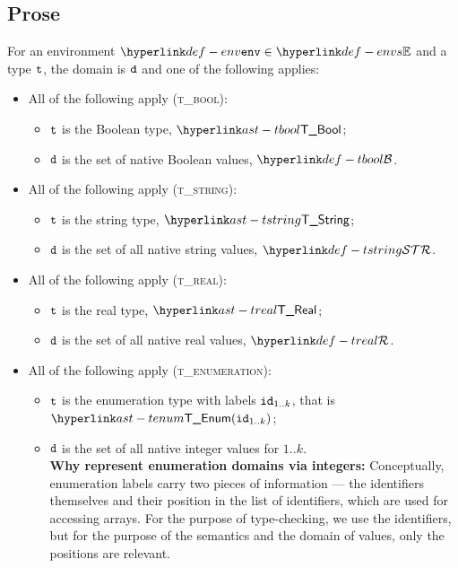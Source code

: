 \subsection{Prose}
For an environment $\env \in \envs$ and a type $\texttt{t}$, the domain is $\texttt{d}$ and one of the following applies:
\begin{itemize}
  \item All of the following apply (\textsc{t\_bool}):
  \begin{itemize}
    \item $\texttt{t}$ is the Boolean type, $\TBool$;
    \item $\texttt{d}$ is the set of native Boolean values, $\tbool$.
  \end{itemize}

  \item All of the following apply (\textsc{t\_string}):
  \begin{itemize}
    \item $\texttt{t}$ is the string type, $\TString$;
    \item $\texttt{d}$ is the set of all native string values, $\tstring$.
  \end{itemize}

  \item All of the following apply (\textsc{t\_real}):
  \begin{itemize}
    \item $\texttt{t}$ is the real type, $\TReal$;
    \item $\texttt{d}$ is the set of all native real values, $\treal$.
  \end{itemize}

  \item All of the following apply (\textsc{t\_enumeration}):
  \begin{itemize}
    \item $\texttt{t}$ is the enumeration type with labels $\texttt{id}_{1..k}$, that is $\TEnum(\id_{1..k})$;
    \item $\texttt{d}$ is the set of all native integer values for $1..k$.\\
    \textbf{Why represent enumeration domains via integers:}
    Conceptually, enumeration labels carry two pieces of information --- the identifiers themselves
    and their position in the list of identifiers, which are used for accessing arrays.
    For the purpose of type-checking, we use the identifiers, but for the purpose of the semantics
    and the domain of values, only the positions are relevant.
  \end{itemize}


\end{itemize}
